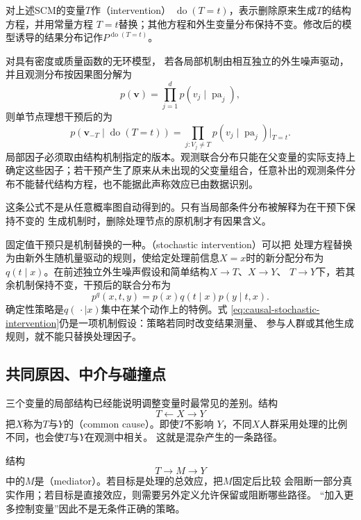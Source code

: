 \begin{definition}[理想干预]
  \label{def:causal-intervention}
对上述SCM的变量\(T\)作（intervention）
\(\operatorname{do}(T=t)\)，表示删除原来生成\(T\)的结构方程，并用常量方程
\(T=t\)替换；其他方程和外生变量分布保持不变。修改后的模型诱导的结果分布记作\(P^{\operatorname{do}(T=t)}\)。
\end{definition}
对具有密度或质量函数的无环模型，
若各局部机制由相互独立的外生噪声驱动，并且观测分布按因果图分解为
\[
  p(\bm{v})=\prod_{j=1}^{d}p(v_j\mid \operatorname{pa}_j),
\]
则单节点理想干预后的为
\begin{equation}
  p(\bm{v}_{-T}\mid\operatorname{do}(T=t))
  =
  \prod_{j:V_j\neq T}
  p(v_j\mid\operatorname{pa}_j)
  \big|_{T=t}.
  \label{eq:causal-truncated-factorization}
\end{equation}
局部因子必须取由结构机制指定的版本。观测联合分布只能在父变量的实际支持上确定这些因子；若干预产生了原来从未出现的父变量组合，任意补出的观测条件分布不能替代结构方程，也不能据此声称效应已由数据识别。

这条公式不是从任意概率图自动得到的。只有当局部条件分布被解释为在干预下保持不变的
生成机制时，删除处理节点的原机制才有因果含义。

固定值干预只是机制替换的一种。（stochastic intervention）可以把
处理方程替换为由新外生随机量驱动的规则，使给定处理前信息\(X=x\)时的新分配分布为
\(q(t\mid x)\)。在前述独立外生噪声假设和简单结构\(X\to T\)、\(X\to Y\)、
\(T\to Y\)下，若其余机制保持不变，干预后的联合分布为
\begin{equation}
  p^q(x,t,y)
  =
  p(x)q(t\mid x)p(y\mid t,x).
  \label{eq:causal-stochastic-intervention}
\end{equation}
确定性策略是\(q(\,\cdot\mid x)\)集中在某个动作上的特例。式
\eqref{eq:causal-stochastic-intervention}仍是一项机制假设：策略若同时改变结果测量、
参与人群或其他生成规则，就不能只替换处理因子。

\subsection{共同原因、中介与碰撞点}

三个变量的局部结构已经能说明调整变量时最常见的差别。结构
\[
  T\leftarrow X\to Y
\]
把\(X\)称为\(T\)与\(Y\)的（common cause）。即使\(T\)不影响
\(Y\)，不同\(X\)人群采用处理的比例不同，也会使\(T\)与\(Y\)在观测中相关。
这就是混杂产生的一条路径。

结构
\[
  T\to M\to Y
\]
中的\(M\)是（mediator）。若目标是处理的总效应，把\(M\)固定后比较
会阻断一部分真实作用；若目标是直接效应，则需要另外定义允许保留或阻断哪些路径。
“加入更多控制变量”因此不是无条件正确的策略。

